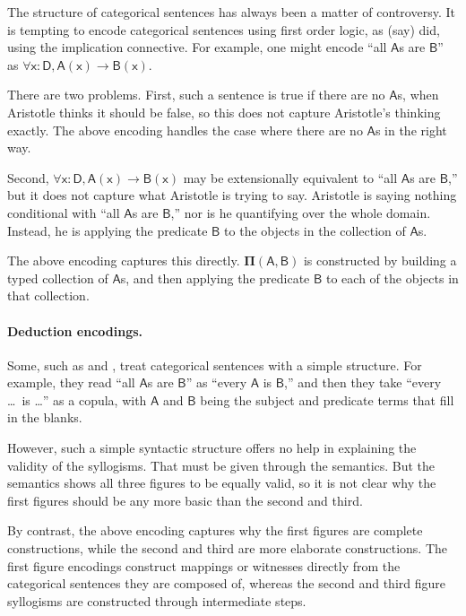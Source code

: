 \documentclass{article}
\newcommand\e{\mathsf}
\def\Arrow/{\e{\rightarrow}}
\def\x/{\e{x}}
\def\A/{\e{A}}
\def\B/{\e{B}}
\def\D/{\e{D}}
\newcommand\Dep[2]{\e{#1(#2)}}
\newcommand\PI[2]{\mathbf{\Pi}\e{(#1, #2)}}
\begin{document}
The structure of categorical sentences has always been a matter of controversy.  It is tempting to encode categorical sentences using first order logic, as (say) \citet{Lukasiewicz1957} did, using the implication connective. For example, one might encode ``all $\A/$s are $\B/$'' as $\forall \x/ : \D/, \Dep{A}{x} \Arrow/ \Dep{B}{x}$. 

There are two problems. First, such a sentence is true if there are no $\A/$s, when Aristotle thinks it should be false, so this does not capture Aristotle's thinking exactly. The above encoding handles the case where there are no $\A/$s in the right way.

Second, $\forall \x/ : \D/, \Dep{A}{x} \Arrow/ \Dep{B}{x}$ may be extensionally equivalent to ``all $\A/$s are $\B/$,'' but it does not capture what Aristotle is trying to say. Aristotle is saying nothing conditional with ``all $\A/$s are $\B/$,'' nor is he quantifying over the whole domain. Instead, he is applying the predicate $\B/$ to the objects in the collection of $\A/$s.

The above encoding captures this directly. $\PI{A}{B}$ is constructed by building a typed collection of $\A/$s, and then applying the predicate $\B/$ to each of the objects in that collection.


\paragraph{Deduction encodings.}

Some, such as \citet{Corcoran1974} and \citet{Smiley1973}, treat categorical sentences with a simple structure. For example, they read ``all $\A/$s are $\B/$'' as ``every $\A/$ is $\B/$,'' and then they take ``every \ldots~is \ldots'' as a copula, with $\A/$ and $\B/$ being the subject and predicate terms that fill in the blanks.

However, such a simple syntactic structure offers no help in explaining the validity of the syllogisms. That must be given through the semantics. But the semantics shows all three figures to be equally valid, so it is not clear why the first figures should be any more basic than the second and third.

By contrast, the above encoding captures why the first figures are complete constructions, while the second and third are more elaborate constructions. The first figure encodings construct mappings or witnesses directly from the categorical sentences they are composed of, whereas the second and third figure syllogisms are constructed through intermediate steps.
\end{document}
